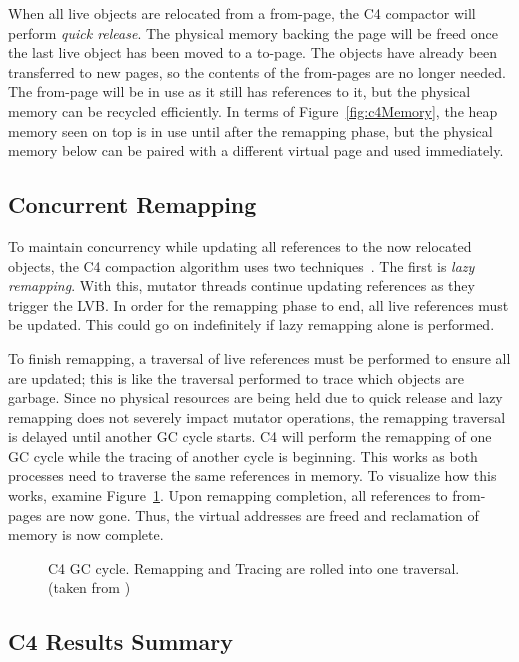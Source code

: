 \documentclass{sig-alternate}
\begin{document}
When all live objects are relocated from a from-page,
the C4 compactor will perform \emph{quick release}. 
The physical memory backing the page will be freed
once the last live object has been moved to a to-page. The objects have already 
been transferred to new pages, so the contents of the from-pages are no longer needed. The from-page 
will be in use as it still has references to it, but the physical memory can be recycled efficiently. 
In terms of Figure~\ref{fig:c4Memory}, the heap
memory seen on top is in use until after the remapping phase, but the physical memory below 
can be paired with a different virtual page and used immediately.


\subsection{Concurrent Remapping}
\label{sec:c4Remapping}

To maintain concurrency while updating all references to the now relocated
objects, the C4 compaction algorithm uses two techniques~\cite{Tene:C4}. The first is
\emph{lazy remapping}. With this, mutator
threads continue updating references as they trigger the LVB. In order for
the remapping phase to end, all live references must be updated.
This could go on indefinitely if lazy remapping alone is performed.

To finish remapping, a traversal of live references must be performed to
ensure all are updated; this is like the traversal performed to trace which
objects are garbage. Since no physical resources are being held due
to quick release and lazy remapping does not severely impact mutator operations,
the remapping traversal is delayed until another GC cycle starts.
C4 will perform the remapping of one GC cycle while the tracing
of another cycle is beginning. This works as both processes need to traverse
the same references in memory. To
visualize how this works, examine Figure~\ref{fig:c4Cycle}. Upon remapping completion, 
all references to from-pages are now gone. Thus, the virtual addresses
are freed and reclamation of memory is now complete. 

\begin{figure}
\centering
{}
\caption{C4 GC cycle. Remapping and Tracing are rolled into one traversal.
(taken from \cite{Tene:C4})}
\label{fig:c4Cycle}
\end{figure}


\subsection{C4 Results Summary}
\label{sec:c4Results}
\end{document}
